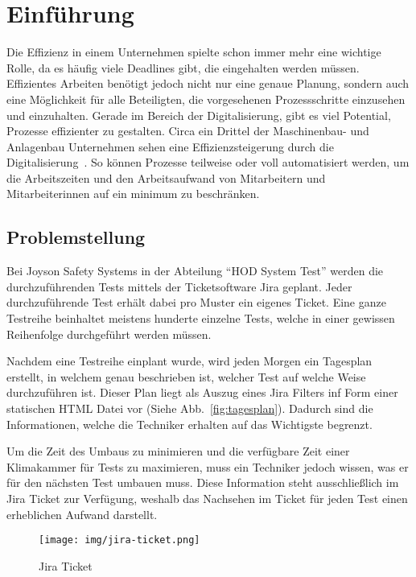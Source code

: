 \section{Einführung}

Die Effizienz in einem Unternehmen spielte schon immer mehr eine wichtige Rolle,
da es häufig viele Deadlines gibt, die eingehalten werden müssen. Effizientes 
Arbeiten benötigt jedoch nicht nur eine genaue Planung, sondern auch eine 
Möglichkeit für alle Beteiligten, die vorgesehenen Prozessschritte einzusehen 
und einzuhalten. Gerade im Bereich der Digitalisierung, gibt es viel Potential, 
Prozesse effizienter zu gestalten. Circa ein Drittel der Maschinenbau- und 
Anlagenbau Unternehmen sehen eine Effizienzsteigerung durch die 
Digitalisierung~\cite{Bre17}. So können Prozesse teilweise oder voll automatisiert
werden, um die Arbeitszeiten und den Arbeitsaufwand von Mitarbeitern und Mitarbeiterinnen
auf ein minimum zu beschränken. 

\subsection{Problemstellung}\label{sec:problems}
Bei Joyson Safety Systems in der Abteilung ``\gls{HOD} System Test'' werden die 
durchzuführenden Tests mittels der Ticketsoftware \gls{Jira} geplant. Jeder durchzuführende
Test erhält dabei pro Muster ein eigenes Ticket. Eine ganze Testreihe 
beinhaltet meistens hunderte einzelne Tests, welche in einer gewissen
Reihenfolge durchgeführt werden müssen. 

Nachdem eine Testreihe einplant wurde, wird jeden Morgen ein Tagesplan 
erstellt, in welchem genau beschrieben ist, welcher Test auf welche Weise 
durchzuführen ist. Dieser Plan liegt als Auszug eines \gls{Jira} Filters inf Form 
einer statischen HTML Datei vor (Siehe Abb.~\ref{fig:tagesplan}). Dadurch sind 
die Informationen, welche die \gls{Techniker} erhalten auf das Wichtigste begrenzt. 

Um die Zeit des Umbaus zu minimieren und die verfügbare Zeit einer Klimakammer
für Tests zu maximieren, muss ein \gls{Techniker} jedoch wissen, was er für den 
nächsten Test umbauen muss. Diese Information steht ausschließlich im \gls{Jira}  
Ticket zur Verfügung, weshalb das Nachsehen im Ticket für jeden Test einen
erheblichen Aufwand darstellt.

\begin{figure}[H]
    \texttt{[image: img/jira-ticket.png]}
    \caption{\gls{Jira} Ticket}
\end{figure}

